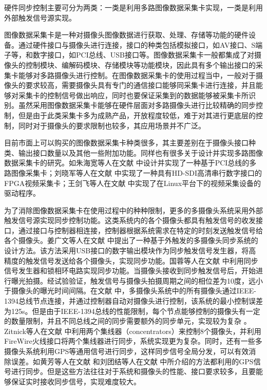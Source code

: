 硬件同步控制主要可分为两类：一类是利用多路图像数据采集卡实现，一类是利用外部触发信号源实现。

图像数据采集卡是一种对摄像头图像数据进行获取、处理、存储等功能的硬件设备。通过硬件接口与摄像头进行连接，接口的种类包括模拟接口，如AV接口、S端子等，和数字接口，如PCI总线、USB接口等。图像数据采集卡一般都集成了对摄像头的控制模块、编解码模块、存储模块等功能模块，因此具有多个输出接口的采集卡能够对多路摄像头进行控制。在图像数据采集卡的使用过程当中，一般对于摄像头的要求较高，需要摄像头具有专门的通信接口能够同采集卡进行连接，并且能够对采集卡的控制信号做出响应，同时也要保证采集到的数据能够被采集卡所识别。虽然采用图像数据采集卡能够在硬件层面对多路摄像头进行比较精确的同步控制，但是由于此类采集卡多为成熟产品，开放程度较低，难于对其进行更底层的控制，同时对于摄像头的要求限制也较多，其应用场景并不广泛。

目前市面上可以购买的图像数据采集卡种类很多，其主要差别在于摄像头接口种类、输出接口数量以及其他一些附加功能。同样也有很多关于设计并实现多路图像数据采集卡的研究。如朱海宽等人在文献 \cite{17} 中设计并实现了一种基于PCI总线的多路图像采集卡；刘晓军等人在文献 \cite{刘晓军2009采用} 中实现了一种具有HD-SDI高清串行数字接口的FPGA视频采集卡；王剑飞等人在文献 \cite{王剑非2007基于} 中实现了在Linux平台下的视频采集设备的驱动程序。

为了消除图像数据采集卡在使用过程中的种种限制，更多的多摄像头系统采用外部触发信号源实现同步控制功能。这类系统内的各个摄像头都具有触发信号的收发接口，通过接口与控制器相连接，控制器根据系统需求在特定的时刻发送触发信号给各个摄像头。姜广文等人在文献 \cite{姜广文} 中提出了一种基于外触发的多摄像头同步系统的设计方法。该方法采用USB接口的数字输出模块作为同步触发信号发生器，将高精度的触发信号发送给各个摄像头，实现同步功能。国蓉等人在文献 \cite{国蓉2014具有} 中利用同步信号发生器和锁相环电路实现同步功能。当摄像头接收到同步触发信号后，开始进行曝光拍摄。经试验验证，触发信号与摄像头拍摄周期之间的相位差为10度，远小于摄像头的曝光时间间隔。在文献 \cite{Prochazka} 中，多摄像头系统中的所有摄像头通过IEEE-1394总线节点连接，并通过控制器自动对摄像头进行控制，该系统的最小控制误差为125\textmu s。但是由于IEEE-1394总线的性能限制，每个节点能够控制的摄像头有一定的数量限制，并且不同总线之间的同步需要额外的同步单元，实现较为复杂 \cite{Litos}。Zitnick等人在文献 \cite{Zitnick} 中利用两个集线器（concentrators）来控制8个摄像头，并利用FireWire火线接口将两个集线器进行同步，系统实现更为复杂。同时，还有一些多摄像头系统利用GPS等通用信号进行同步，这样同步信号全局分发，可以有效消除误差。如黄芳等人在文献 \cite{黄芳} 和刘团结等人在文献 \cite{刘团结} 中所介绍的方法都利用的GPS信号进行同步。但是这些方法往往对于系统和摄像头的性能、接口要求较多，且要能够保证实时接收同步信号，实现难度较大。

